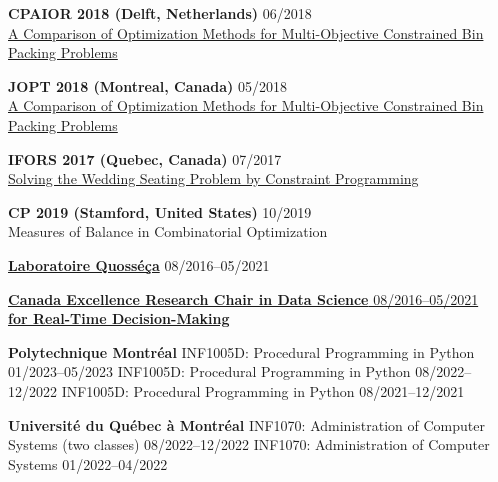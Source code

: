 \documentclass{memoir}
\begin{document}
\begin{list}{}
  \Item \textbf{CPAIOR 2018 (Delft, Netherlands)} \hfill 06/2018 \\
  \href{http://icaps18.icaps-conference.org/schedule}{A Comparison of Optimization Methods for Multi-Objective Constrained Bin Packing Problems}

  \Item \textbf{JOPT 2018 (Montreal, Canada)} \hfill 05/2018 \\
  \href{https://symposia.gerad.ca/jopt2018/en/schedule?slot_id=1374}{A Comparison of Optimization Methods for Multi-Objective Constrained Bin Packing Problems}

  \Item \textbf{IFORS 2017 (Quebec, Canada)} \hfill 07/2017 \\
  \href{https://www.euro-online.org/conf/ifors2017/treat_abstract?paperid=1523}{Solving the Wedding Seating Problem by Constraint Programming}



  \Item \textbf{CP 2019 (Stamford, United States)} \hfill 10/2019 \\
  Measures of Balance in Combinatorial Optimization



  \Item \href{https://www.polymtl.ca/labo-quosseca/en/members/alumni/doctoral-students}{\textbf{Laboratoire Quosséça}} \hfill 08/2016--05/2021

  \Item \href{http://cerc-datascience.polymtl.ca/person/philippe-olivier}{\textbf{Canada Excellence Research Chair in Data Science} \hfill 08/2016--05/2021 \\ \textbf{for Real-Time Decision-Making}} 




  \Item \textbf{Polytechnique Montréal}
  \BulletItem INF1005D: Procedural Programming in Python \hfill 01/2023--05/2023
  \BulletItem INF1005D: Procedural Programming in Python \hfill 08/2022--12/2022
  \BulletItem INF1005D: Procedural Programming in Python \hfill 08/2021--12/2021

  \Item \textbf{Université du Québec à Montréal}
  \BulletItem INF1070: Administration of Computer Systems (two classes) \hfill 08/2022--12/2022
  \BulletItem INF1070: Administration of Computer Systems \hfill 01/2022--04/2022


\end{list}
\end{document}

